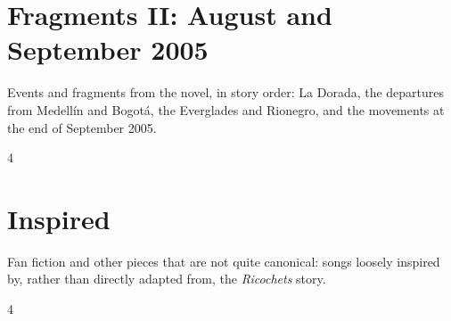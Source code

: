 \documentclass[a4paper,landscape]{memoir}
\begin{document}
\chapter{Fragments II: August and September 2005}
Events and fragments from the novel, in story order: La Dorada, the departures from Medellín and Bogotá, the Everglades and Rionegro, and the movements at the end of September 2005.
\clearpage\begin{multicols*}{4}


















\end{multicols*}

\chapter{Inspired}
Fan fiction and other pieces that are not quite canonical: songs loosely inspired by, rather than directly adapted from, the \emph{Ricochets} story.
\clearpage\begin{multicols*}{4}



\end{multicols*}

\appendix

\backmatter
\printindex[songs]
\clearpage
\printindex[tags]
\end{document}
